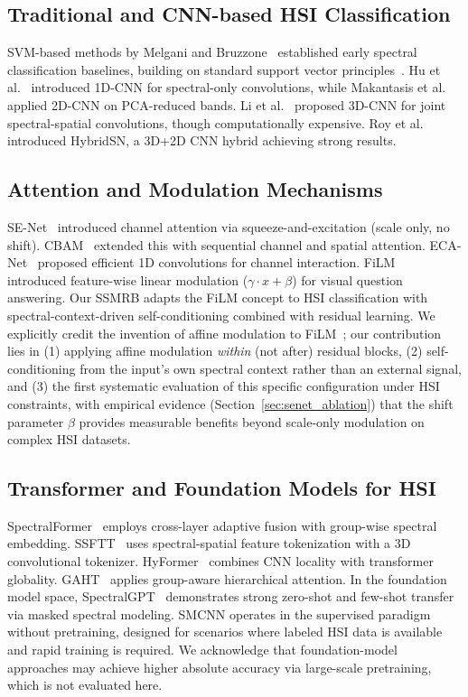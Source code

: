 \documentclass[conference]{IEEEtran}
\begin{document}
\subsection{Traditional and CNN-based HSI Classification}

SVM-based methods by Melgani and Bruzzone~\cite{melgani2004classification} established early spectral classification baselines, building on standard support vector principles~\cite{cortes1995support}. Hu et al.~\cite{hu2015deep} introduced 1D-CNN for spectral-only convolutions, while Makantasis et al.~\cite{makantasis2015deep} applied 2D-CNN on PCA-reduced bands. Li et al.~\cite{li2017spectral} proposed 3D-CNN for joint spectral-spatial convolutions, though computationally expensive. Roy et al.~\cite{roy2020hybridsn} introduced HybridSN, a 3D+2D CNN hybrid achieving strong results.

\subsection{Attention and Modulation Mechanisms}

SE-Net~\cite{hu2018squeeze} introduced channel attention via squeeze-and-excitation (scale only, no shift). CBAM~\cite{woo2018cbam} extended this with sequential channel and spatial attention. ECA-Net~\cite{wang2020eca} proposed efficient 1D convolutions for channel interaction. FiLM~\cite{perez2018film} introduced feature-wise linear modulation ($\gamma \cdot x + \beta$) for visual question answering. Our SSMRB adapts the FiLM concept to HSI classification with spectral-context-driven self-conditioning combined with residual learning. We explicitly credit the invention of affine modulation to FiLM~\cite{perez2018film}; our contribution lies in (1) applying affine modulation \textit{within} (not after) residual blocks, (2) self-conditioning from the input's own spectral context rather than an external signal, and (3) the first systematic evaluation of this specific configuration under HSI constraints, with empirical evidence (Section~\ref{sec:senet_ablation}) that the shift parameter $\beta$ provides measurable benefits beyond scale-only modulation on complex HSI datasets.

\subsection{Transformer and Foundation Models for HSI}

SpectralFormer~\cite{hong2022spectralformer} employs cross-layer adaptive fusion with group-wise spectral embedding. SSFTT~\cite{sun2022ssftt} uses spectral-spatial feature tokenization with a 3D convolutional tokenizer. HyFormer~\cite{li2023hyformer} combines CNN locality with transformer globality. GAHT~\cite{mei2022gaht} applies group-aware hierarchical attention. In the foundation model space, SpectralGPT~\cite{hong2024spectralgpt} demonstrates strong zero-shot and few-shot transfer via masked spectral modeling. SMCNN operates in the supervised paradigm without pretraining, designed for scenarios where labeled HSI data is available and rapid training is required. We acknowledge that foundation-model approaches may achieve higher absolute accuracy via large-scale pretraining, which is not evaluated here.
\end{document}
